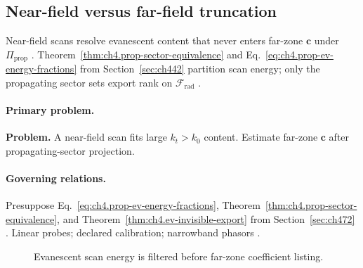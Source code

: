 ﻿\subsection{Near-field versus far-field truncation}
\label{sec:ch4103}

Near-field scans resolve evanescent content that never enters far-zone \(\mathbf{c}\) under \(\Pi_{\mathrm{prop}}\) \cite{stratton1941,harrington2001,jackson1999,devaney2004,hansen1988}.
Theorem~\ref{thm:ch4.prop-sector-equivalence} and Eq.~\eqref{eq:ch4.prop-ev-energy-fractions} from Section~\ref{sec:ch442} partition scan energy; only the propagating
sector sets export rank on \(\mathcal{F}_{\mathrm{rad}}\) \cite{harrington2001,stratton1941,devaney2004}.

\paragraph{Primary problem.}
\textbf{Problem.} A near-field scan fits large \(k_{t}>k_{0}\) content. Estimate far-zone \(\mathbf{c}\) after propagating-sector projection.

\paragraph{Governing relations.}
Presuppose Eq.~\eqref{eq:ch4.prop-ev-energy-fractions}, Theorem~\ref{thm:ch4.prop-sector-equivalence}, and Theorem~\ref{thm:ch4.ev-invisible-export} from
Section~\ref{sec:ch472} \cite{stratton1941,jackson1999,harrington2001,hansen1988,devaney2004}. Linear probes; declared calibration; narrowband phasors
\cite{stratton1941,harrington2001}.

\begin{figure}[t]
\centering
{}
\caption{Evanescent scan energy is filtered before far-zone coefficient listing.}
\label{fig:ch4.ex-nf-ff-truncation}
\end{figure}

